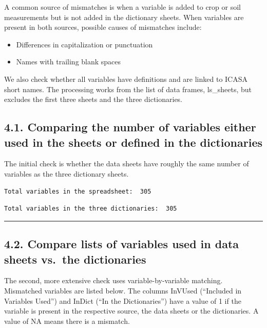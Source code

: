 \documentclass[
]{article}
\providecommand{\tightlist}{%
  \setlength{\itemsep}{0pt}\setlength{\parskip}{0pt}}
\begin{document}
A common source of mismatches is when a variable is added to crop or
soil measurements but is not added in the dictionary sheets. When
variables are present in both sources, possible causes of mismatches
include:

\begin{itemize}
\tightlist
\item
  Differences in capitalization or punctuation
\item
  Names with trailing blank spaces
\end{itemize}

We also check whether all variables have definitions and are linked to
ICASA short names. The processing works from the list of data frames,
ls\_sheets, but excludes the first three sheets and the three
dictionaries.

\subsection{4.1. Comparing the number of variables either used in the
sheets or defined in the
dictionaries}\label{comparing-the-number-of-variables-either-used-in-the-sheets-or-defined-in-the-dictionaries}

The initial check is whether the data sheets have roughly the same
number of variables as the three dictionary sheets.

\begin{verbatim}
Total variables in the spreadsheet:  305
\end{verbatim}

\begin{verbatim}
Total variables in the three dictionaries:  305
\end{verbatim}

\begin{center}\rule{0.5\linewidth}{0.5pt}\end{center}

\subsection{4.2. Compare lists of variables used in data sheets vs.~the
dictionaries}\label{compare-lists-of-variables-used-in-data-sheets-vs.-the-dictionaries}

The second, more extensive check uses variable-by-variable matching.
Mismatched variables are listed below. The columns InVUsed (``Included
in Variables Used'') and InDict (``In the Dictionaries'') have a value
of 1 if the variable is present in the respective source, the data
sheets or the dictionaries. A value of NA means there is a mismatch.
\end{document}
